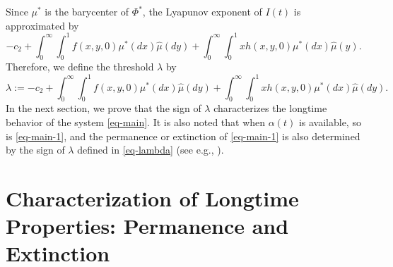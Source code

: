 \documentclass[12pt]{amsart}
\theoremstyle{remark}
\newtheorem{rem}{Remark}
\numberwithin{equation}{section}
\numberwithin{equation}{section}
\newcommand{\1}{\boldsymbol{1}}
\def\hat{\widehat}
\begin{document}
Since $\mu^*$ is the barycenter of $\Phi^*$, the Lyapunov exponent of $I(t)$ is approximated by
$$
-c_2+ \int_0^{\infty}\int_0^1f(x,y,0)\mu^*(dx)\hat\mu(dy)+\int_0^\infty\int_0^1 xh(x,y,0)\mu^*(dx)\hat\mu(y).
$$
Therefore, we define the threshold $\lambda$ by
\begin{equation}\label{eq-lambda}
\lambda:=-c_2+ \int_0^{\infty}\int_0^1f(x,y,0)\mu^*(dx)\hat\mu(dy)+\int_0^\infty\int_0^1 xh(x,y,0)\mu^*(dx)\hat\mu(dy).
\end{equation}
In the next section, we
prove that the sign of $\lambda$
 characterizes the longtime behavior of the system \eqref{eq-main}.
It is also noted that when $\alpha(t)$ is available,
so is \eqref{eq-main-1}, and the permanence or extinction of \eqref{eq-main-1} is also determined by the sign of $\lambda$ defined in \eqref{eq-lambda} (see e.g., \cite{DNY-SPA}).


\section{Characterization of Longtime Properties: Permanence and Extinction}\label{sec:lon}
\end{document}
